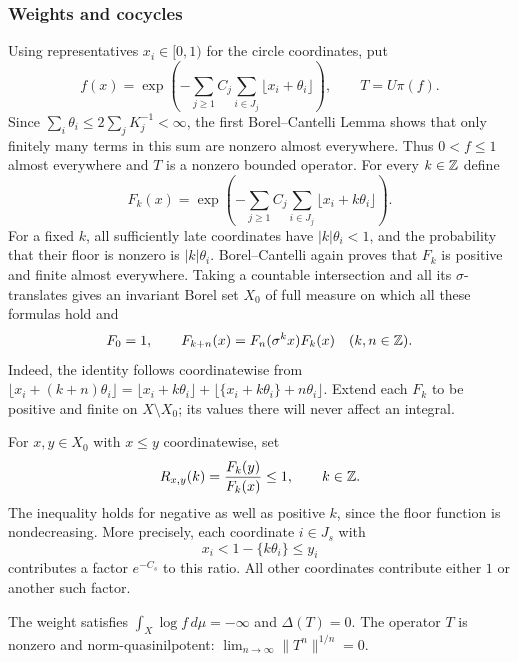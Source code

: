 \subsubsection*{Weights and cocycles}
Using representatives $x_i\in[0,1)$ for the circle coordinates, put
\begin{equation}\label{p:eq:weights}
 f(x)=\exp\!\left(-\sum_{j\geq1}C_j
                    \sum_{i\in J_j}\lfloor x_i+\theta_i\rfloor\right),
 \qquad T=U\pi(f).
\end{equation}
Since $\sum_i\theta_i\leq2\sum_jK_j^{-1}<\infty$, the first
Borel--Cantelli Lemma shows that only finitely many terms in this
sum are nonzero almost everywhere. Thus $0<f\leq1$ almost
everywhere and $T$ is a nonzero bounded operator.
For every $k\in\mathbb Z$ define
\[
 F_k(x)=\exp\!\left(-\sum_{j\geq1}C_j
                    \sum_{i\in J_j}\lfloor x_i+k\theta_i\rfloor\right).
\]
For a fixed $k$, all sufficiently late coordinates have
$|k|\theta_i<1$, and the probability that their floor is nonzero is
$|k|\theta_i$. Borel--Cantelli again proves that $F_k$ is positive
and finite almost everywhere. Taking a countable intersection and
all its $\sigma$-translates gives an invariant Borel set $X_0$ of
full measure on which all these formulas hold and
\begin{equation}\label{p:eq:cocycle}
 F_0=1,\qquad F_{k+n}(x)=F_n(\sigma^k x)F_k(x)
 \quad(k,n\in\mathbb Z).
\end{equation}
Indeed, the identity follows coordinatewise from
$\lfloor x_i+(k+n)\theta_i\rfloor
 =\lfloor x_i+k\theta_i\rfloor
  +\lfloor\{x_i+k\theta_i\}+n\theta_i\rfloor$.
Extend each $F_k$ to be positive and finite on $X\setminus X_0$;
its values there will never affect an integral.

For $x,y\in X_0$ with $x\leq y$ coordinatewise, set
\begin{equation}\label{p:eq:ratio}
 R_{x,y}(k)=\frac{F_k(y)}{F_k(x)}\leq1,\qquad k\in\mathbb Z.
\end{equation}
The inequality holds for negative as well as positive $k$, since
the floor function is nondecreasing. More precisely, each coordinate
$i\in J_s$ with
\begin{equation}\label{p:eq:threshold-crossing}
 x_i<1-\{k\theta_i\}\leq y_i
\end{equation}
contributes a factor $e^{-C_s}$ to this ratio. All other coordinates
contribute either $1$ or another such factor.

\begin{lemma}\label{p:lem:quasinilpotent}
The weight satisfies $\int_X\log f\,d\mu=-\infty$ and $\Delta(T)=0$.
The operator $T$ is nonzero and norm-quasinilpotent:
$\lim_{n\to\infty}\|T^n\|^{1/n}=0$.
\end{lemma}

